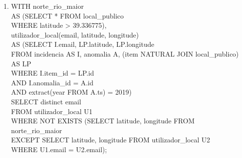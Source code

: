\documentclass[12pt]{report}
\begin{document}
\begin{enumerate}
        \item WITH norte\_rio\_maior \\
              AS (SELECT * FROM local\_publico \\
              \hspace*{1em} WHERE latitude > 39.336775), \\
              \hspace*{1em} utilizador\_local(email, latitude, longitude) \\
              \hspace*{1em} AS (SELECT I.email, LP.latitude, LP.longitude \\
              \hspace*{1em} FROM incidencia AS I, anomalia A, (item NATURAL JOIN local\_publico) AS LP \\
              \hspace*{1em} WHERE I.item\_id = LP.id \\
              \hspace*{1em} AND I.anomalia\_id = A.id \\
              \hspace*{1em} AND extract(year FROM A.ts) = 2019) \\
              SELECT distinct email \\
              FROM utilizador\_local U1 \\
              WHERE NOT EXISTS (SELECT latitude, longitude FROM norte\_rio\_maior\\
              EXCEPT SELECT latitude, longitude FROM utilizador\_local U2 \\
              WHERE U1.email = U2.email);


\end{enumerate}
\end{document}
